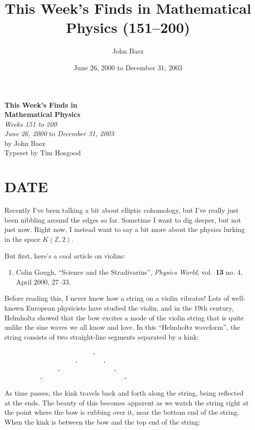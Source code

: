 \documentclass{article}
\title{This Week's Finds in Mathematical Physics (151--200)}
\author{John Baez}
\date{June 26, 2000 to December 31, 2003}
\def\tightlist{}
\begin{document}
\begin{titlepage}
  \begin{center}
    {\Huge\textbf{This Week's Finds in}}
  \\[0.7em]{\Huge\textbf{Mathematical Physics}}
  \\[1em]{\huge\textit{Weeks 151 to 200}}
  \\[4em]{\LARGE \textit{June 26, 2000} to \textit{December 31, 2003}}
  \\[4em]{\huge by John Baez}
  \\[0.5em]{\Large{Typeset by Tim Hosgood}}
  \end{center}
\end{titlepage}

\tableofcontents

\hypertarget{week151}{%
\section{DATE}\label{week151}}

Recently I've been talking a bit about elliptic cohomology, but I've
really just been nibbling around the edges so far. Sometime I want to
dig deeper, but not just now. Right now, I instead want to say a bit
more about the physics lurking in the space \(K(\mathbb{Z},2)\).

But first, here's a cool article on violins:

\begin{enumerate}
\def\labelenumi{\arabic{enumi})}
\tightlist
\item
  Colin Gough, ``Science and the Stradivarius'', \emph{Physics World},
  vol.~\textbf{13} no. 4, April 2000, 27--33.
\end{enumerate}

Before reading this, I never knew how a string on a violin vibrates!
Lots of well-known European physicists have studied the violin, and in
the 19th century, Helmholtz showed that the bow excites a mode of the
violin string that is quite unlike the sine waves we all know and love.
In this ``Helmholtz waveform'', the string consists of two straight-line
segments separated by a kink:

\begin{verbatim}
                         .   
                    .       .
               .               .
          .                       .
\end{verbatim}

As time passes, the kink travels back and forth along the string, being
reflected at the ends. The beauty of this becomes apparent as we watch
the string right at the point where the bow is rubbing over it, near the
bottom end of the string. When the kink is between the bow and the top
end of the string:
\end{document}
